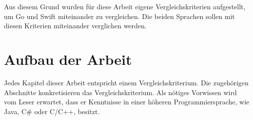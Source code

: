 Aus diesem Grund wurden für diese Arbeit eigene Vergleichskriterien aufgestellt, um Go und Swift miteinander zu vergleichen.
Die beiden Sprachen sollen mit diesen Kriterien miteinander verglichen werden.

\section{Aufbau der Arbeit}
Jedes Kapitel dieser Arbeit entspricht einem Vergleichskriterium.
Die zugehörigen Abschnitte konkretisieren das Vergleichskriterium.
Als nötiges Vorwissen wird vom Leser erwartet, dass er Kenntnisse in einer höheren Programmiersprache, wie Java, C\# oder C/C++, besitzt. 